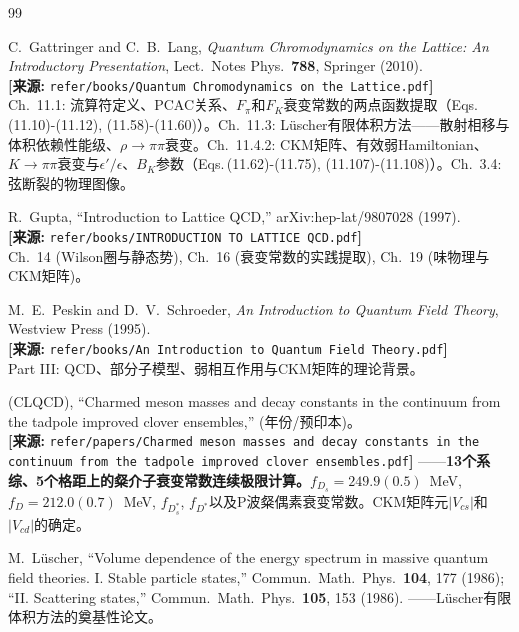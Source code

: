 \documentclass[12pt,a4paper]{ctexart}
\theoremstyle{definition}
\begin{document}
\begin{thebibliography}{99}

C.~Gattringer and C.~B.~Lang,
\textit{Quantum Chromodynamics on the Lattice: An Introductory Presentation},
Lect.\ Notes Phys.\ \textbf{788}, Springer (2010).
\\\textbf{[来源:} \texttt{refer/books/Quantum Chromodynamics on the Lattice.pdf}\textbf{]}
\\Ch.~11.1: 流算符定义、PCAC关系、$F_\pi$和$F_K$衰变常数的两点函数提取（Eqs.\,(11.10)-(11.12), (11.58)-(11.60)）。Ch.~11.3: L\"uscher有限体积方法——散射相移与体积依赖性能级、$\rho\to\pi\pi$衰变。Ch.~11.4.2: CKM矩阵、有效弱Hamiltonian、$K\to\pi\pi$衰变与$\epsilon'/\epsilon$、$B_K$参数（Eqs.\,(11.62)-(11.75), (11.107)-(11.108)）。Ch.~3.4: 弦断裂的物理图像。

R.~Gupta,
``Introduction to Lattice QCD,''
arXiv:hep-lat/9807028 (1997).
\\\textbf{[来源:} \texttt{refer/books/INTRODUCTION TO LATTICE QCD.pdf}\textbf{]}
\\Ch.~14 (Wilson圈与静态势), Ch.~16 (衰变常数的实践提取), Ch.~19 (味物理与CKM矩阵)。

M.~E.~Peskin and D.~V.~Schroeder,
\textit{An Introduction to Quantum Field Theory},
Westview Press (1995).
\\\textbf{[来源:} \texttt{refer/books/An Introduction to Quantum Field Theory.pdf}\textbf{]}
\\Part III: QCD、部分子模型、弱相互作用与CKM矩阵的理论背景。

(CLQCD),
``Charmed meson masses and decay constants in the continuum from the tadpole improved clover ensembles,''
(年份/预印本)。
\\\textbf{[来源:} \texttt{refer/papers/Charmed meson masses and decay constants in the continuum from the tadpole improved clover ensembles.pdf}\textbf{]}
——\textbf{13个系综、5个格距上的粲介子衰变常数连续极限计算。}$f_{D_s}=249.9(0.5)$~MeV, $f_D=212.0(0.7)$~MeV, $f_{D_s^*}$, $f_{D^*}$以及P波粲偶素衰变常数。CKM矩阵元$|V_{cs}|$和$|V_{cd}|$的确定。

M.~L\"uscher,
``Volume dependence of the energy spectrum in massive quantum field theories. I. Stable particle states,''
Commun.\ Math.\ Phys.\ \textbf{104}, 177 (1986);
``II. Scattering states,'' Commun.\ Math.\ Phys.\ \textbf{105}, 153 (1986).
——L\"uscher有限体积方法的奠基性论文。


\end{thebibliography}
\end{document}
